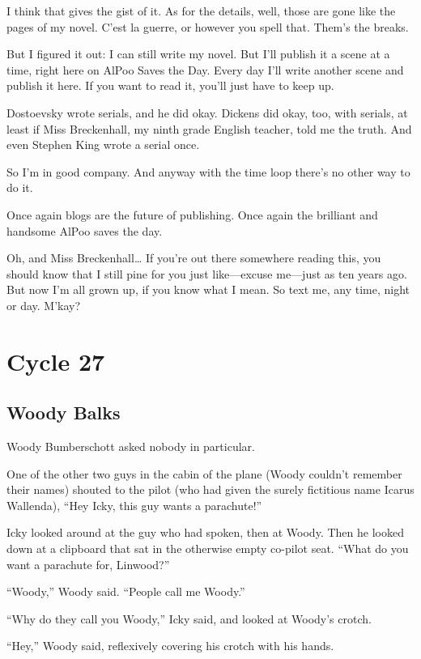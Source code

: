 I think that gives the gist of it. As for the details, well, those are gone like the pages of my novel. C'est la guerre, or however you spell that. Them's the breaks.

But I figured it out: I can still write my novel. But I'll publish it a scene at a time, right here on AlPoo Saves the Day. Every day I'll write another scene and publish it here. If you want to read it, you'll just have to keep up.

Dostoevsky wrote serials, and he did okay. Dickens did okay, too, with serials, at least if Miss Breckenhall, my ninth grade English teacher, told me the truth. And even Stephen King wrote a serial once.

So I'm in good company. And anyway with the time loop there's no other way to do it.

Once again blogs are the future of publishing. Once again the brilliant and handsome AlPoo saves the day.

Oh, and Miss Breckenhall… If you're out there somewhere reading this, you should know that I still pine for you just like---excuse me---just as ten years ago. But now I'm all grown up, if you know what I mean. So text me, any time, night or day. M'kay?

\part{Cycle 27}

\chapter{Woody Balks}

 Woody Bumberschott asked nobody in particular.

One of the other two guys in the cabin of the plane (Woody couldn't remember their names) shouted to the pilot (who had given the surely fictitious name Icarus Wallenda), ``Hey Icky, this guy wants a parachute!''

Icky looked around at the guy who had spoken, then at Woody. Then he looked down at a clipboard that sat in the otherwise empty co-pilot seat. ``What do you want a parachute for, Linwood?''

``Woody,'' Woody said. ``People call me Woody.''

``Why do they call you Woody,'' Icky said, and looked at Woody's crotch.

``Hey,'' Woody said, reflexively covering his crotch with his hands.

